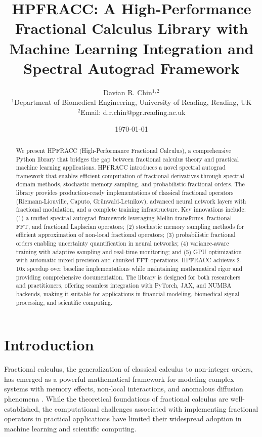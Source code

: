 \documentclass[12pt]{article}
\title{HPFRACC: A High-Performance Fractional Calculus Library with Machine Learning Integration and Spectral Autograd Framework}
\author{
Davian R. Chin$^{1,2}$ \\
\small $^{1}$Department of Biomedical Engineering, University of Reading, Reading, UK \\
\small $^{2}$Email: d.r.chin@pgr.reading.ac.uk
}
\date{\today}
\begin{document}
\maketitle

\begin{abstract}
We present HPFRACC (High-Performance Fractional Calculus), a comprehensive Python library that bridges the gap between fractional calculus theory and practical machine learning applications. HPFRACC introduces a novel spectral autograd framework that enables efficient computation of fractional derivatives through spectral domain methods, stochastic memory sampling, and probabilistic fractional orders. The library provides production-ready implementations of classical fractional operators (Riemann-Liouville, Caputo, Grünwald-Letnikov), advanced neural network layers with fractional modulation, and a complete training infrastructure. Key innovations include: (1) a unified spectral autograd framework leveraging Mellin transforms, fractional FFT, and fractional Laplacian operators; (2) stochastic memory sampling methods for efficient approximation of non-local fractional operators; (3) probabilistic fractional orders enabling uncertainty quantification in neural networks; (4) variance-aware training with adaptive sampling and real-time monitoring; and (5) GPU optimization with automatic mixed precision and chunked FFT operations. HPFRACC achieves 2-10x speedup over baseline implementations while maintaining mathematical rigor and providing comprehensive documentation. The library is designed for both researchers and practitioners, offering seamless integration with PyTorch, JAX, and NUMBA backends, making it suitable for applications in financial modeling, biomedical signal processing, and scientific computing.
\end{abstract}

\section{Introduction}

Fractional calculus, the generalization of classical calculus to non-integer orders, has emerged as a powerful mathematical framework for modeling complex systems with memory effects, non-local interactions, and anomalous diffusion phenomena \cite{Hafez2025ReviewFractionalDifferentiation}. While the theoretical foundations of fractional calculus are well-established, the computational challenges associated with implementing fractional operators in practical applications have limited their widespread adoption in machine learning and scientific computing.
\end{document}
